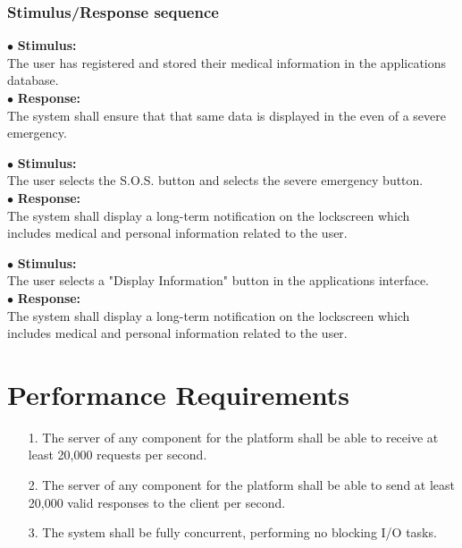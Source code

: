 \documentclass{scrreprt}
\begin{document}
\subsubsection{Stimulus/Response sequence}
\vspace{4mm}
	$\bullet$ \textbf{Stimulus:} \\ \hspace{5mm} The user has registered and stored their medical information in the applications database. \\
	$\bullet$ \textbf{Response:} \\ \hspace{5mm} The system shall ensure that that same data is displayed in the even of a severe emergency. 
	
\vspace{4mm}
	\hspace{-4.75mm} $\bullet$ \textbf{Stimulus:} \\ \hspace{5mm} The user selects the S.O.S. button and selects the severe emergency button. \\
	$\bullet$ \textbf{Response:} \\ \hspace{5mm} The system shall display a long-term notification on the lockscreen which includes medical and personal information related to the user. 

\vspace{4mm}
	\hspace{-4.75mm} $\bullet$ \textbf{Stimulus:} \\ \hspace{5mm} The user selects a "Display Information" button in the applications interface. \\
	$\bullet$ \textbf{Response:} \\ \hspace{5mm} The system shall display a long-term notification on the lockscreen which includes medical and personal information related to the user. 
	

\section{Performance Requirements}
\begin{enumerate}
	\item[1.] The server of any component for the platform shall be able to receive at least 20,000 requests per second.
	\item[2.] The server of any component for the platform shall be able to send at least 20,000 valid responses to the client per second.
	\item[3.] The system shall be fully concurrent, performing no blocking I/O tasks.
\end{enumerate}
\end{document}
